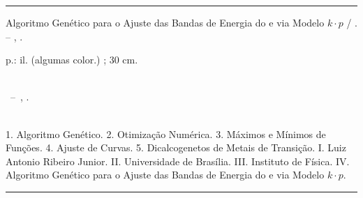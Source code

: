\begin{fichacatalografica}
  \vspace*{\fill}                   %
  \hrule                            %
  \begin{center}                    %
    \begin{minipage}[c]{12.5cm}     %
      
      \imprimirautor
      
      \hspace{0.5cm} Algoritmo Genético para o Ajuste das Bandas de Energia do  e  via Modelo $k \cdot p$ / \imprimirautor. --
      \imprimirlocal, \imprimirdata.
      
      \hspace{0.5cm} \pageref{LastPage} p.: il. (algumas color.) ; 30 cm.\\
      
      \hspace{0.5cm} \imprimirorientadorRotulo~\imprimirorientador\\
      
      \hspace{0.5cm}
      \parbox[t]{\textwidth}{\imprimirtipotrabalho~--~\imprimirinstituicao,
        \imprimirdata.}\\
      
      \hspace{0.5cm}
      1. Algoritmo Genético.
      2. Otimização Numérica.
      3. Máximos e Mínimos de Funções.
      4. Ajuste de Curvas.
      5. Dicalcogenetos de Metais de Transição.
      I. Luiz Antonio Ribeiro Junior.
      II. Universidade de Brasília.
      III. Instituto de Física.
      IV. Algoritmo Genético para o Ajuste das Bandas de Energia do  e  via Modelo $k \cdot p$.\\
      
      
    \end{minipage}
  \end{center}
  \hrule
\end{fichacatalografica}